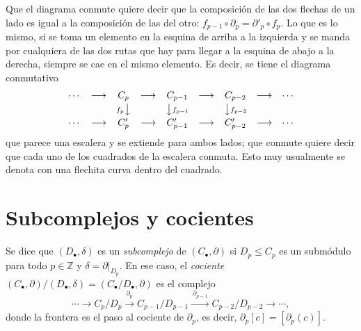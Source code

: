 \documentclass[11pt]{article}
\begin{document}
Que el diagrama conmute quiere decir que la composición de las dos flechas de un lado es igual a la composición de las del otro: $f_{p-1}\circ\partial_p=\partial'_p\circ f_p$. Lo que es lo mismo, si se toma un elemento en la esquina de arriba a la izquierda y se manda por cualquiera de las dos rutas que hay para llegar a la esquina de abajo a la derecha, siempre se cae en el mismo elemento. Es decir, se tiene el diagrama conmutativo
\[
  \begin{array}{ccccccccc}
    \cdots & \longrightarrow & C_p & \longrightarrow & C_{p-1} & \longrightarrow & C_{p-2} & \longrightarrow & \cdots\\[2pt]
    & & {\scriptstyle f_p}\big\downarrow & & \big\downarrow{\scriptstyle f_{p-1}} & & \big\downarrow{\scriptstyle f_{p-2}} & & \\[2pt]
    \cdots & \longrightarrow & C'_p & \longrightarrow & C'_{p-1} & \longrightarrow & C'_{p-2} & \longrightarrow & \cdots
  \end{array}
\]
que parece una escalera y se extiende para ambos lados; que conmute quiere decir que cada uno de los cuadrados de la escalera conmuta. Esto muy usualmente se denota con una flechita curva dentro del cuadrado.

\section*{Subcomplejos y cocientes}

\begin{defn}\label{def:subcomplejo}
Se dice que $(D_\bullet,\delta)$ es un \emph{subcomplejo} de $(C_\bullet,\partial)$ si $D_p\le C_p$ es un submódulo para todo $p\in\mathbb Z$ y $\delta=\partial|_{D_p}$. En ese caso, el \emph{cociente} $(C_\bullet,\partial)/(D_\bullet,\delta)=(C_\bullet/D_\bullet,\partial)$ es el complejo
\[
  \cdots\longrightarrow C_p/D_p\xrightarrow{\ \partial_p\ }C_{p-1}/D_{p-1}\xrightarrow{\ \partial_{p-1}\ }C_{p-2}/D_{p-2}\longrightarrow\cdots,
\]
donde la frontera es el paso al cociente de $\partial_p$, es decir, $\partial_p[c]=[\partial_p(c)]$.
\end{defn}
\end{document}
